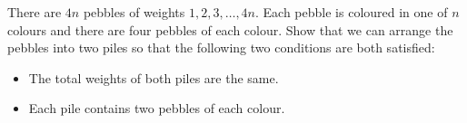 There are $4n$ pebbles of weights $1,2,3,\dots,4n$. Each pebble is coloured in one of $n$ colours and there are four pebbles of each colour. Show that we can arrange the pebbles into two piles so that the following two conditions are both satisfied:
\begin{itemize}
	\item The total weights of both piles are the same.
	\item Each pile contains two pebbles of each colour.
\end{itemize}
